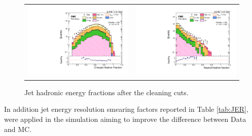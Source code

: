 \begin{figure}[!ht]
\caption{Jet hadronic energy fractions after the cleaning cuts.}
\begin{tabular}{cc}
  \includegraphics[width=230pt]{figuresCONDI/OBj/LOG_can_h_chf.pdf} &
  \includegraphics[width=230pt]{figuresCONDI/OBj/LOG_can_h_nhf.pdf} \\
\end{tabular}
\label{fig:jetclen}
\end{figure}

In addition jet energy resolution smearing factors reported in Table \ref{tab:JER},  were applied in the simulation aiming to improve the difference between Data and MC.

